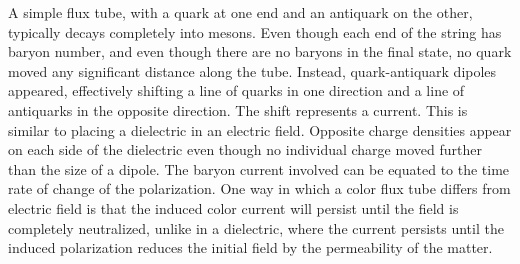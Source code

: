 \documentclass[aps, prc, 12pt, nofootinbib, showpacs, superscriptaddress, tightenlines, groupedaddress]{revtex4-2}
\begin{document}
A simple flux tube, with a quark at one end and an antiquark on the other, typically decays completely into mesons. Even though each end of the string has baryon number, and even though there are no baryons in the final state, no quark moved any significant distance along the tube. Instead, quark-antiquark dipoles appeared, effectively shifting a line of quarks in one direction and a line of antiquarks in the opposite direction. The shift represents a current. This is similar to placing a dielectric in an electric field. Opposite charge densities appear on each side of the dielectric even though no individual charge moved further than the size of a dipole. The baryon current involved can be equated to the time rate of change of the polarization. One way in which a color flux tube differs from electric field is that the induced color current will persist until the field is completely neutralized, unlike in a dielectric, where the current persists until the induced polarization reduces the initial field by the permeability of the matter.
\end{document}
